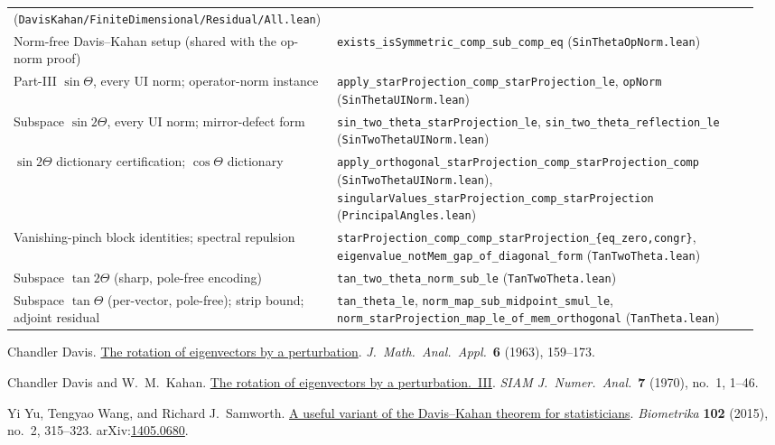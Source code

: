\documentclass[11pt]{article}
\theoremstyle{remark}
\begin{document}
\begin{center}
\begin{tabular}{@{}p{0.40\linewidth}p{0.56\linewidth}@{}}
    (\texttt{DavisKahan/FiniteDimensional/Residual/All.lean}) \\
Norm-free Davis--Kahan setup (shared with the op-norm proof)
  & \texttt{exists\_isSymmetric\_comp\_sub\_comp\_eq}
    (\texttt{SinThetaOpNorm.lean}) \\
Part-III $\sin\Theta$, every UI norm; operator-norm instance
  & \texttt{apply\_starProjection\_comp\_starProjection\_le},
    \texttt{opNorm} (\texttt{SinThetaUINorm.lean}) \\
Subspace $\sin2\Theta$, every UI norm; mirror-defect form
  & \texttt{sin\_two\_theta\_starProjection\_le},
    \texttt{sin\_two\_theta\_reflection\_le}
    (\texttt{SinTwoThetaUINorm.lean}) \\
$\sin2\Theta$ dictionary certification; $\cos\Theta$ dictionary
  & \texttt{apply\_orthogonal\_starProjection\_comp\_starProjection\_comp}
    (\texttt{SinTwoThetaUINorm.lean}),
    \texttt{singularValues\_starProjection\_comp\_starProjection}
    (\texttt{PrincipalAngles.lean}) \\
Vanishing-pinch block identities; spectral repulsion
  & \texttt{starProjection\_comp\_comp\_starProjection\_\{eq\_zero,congr\}},
    \texttt{eigenvalue\_notMem\_gap\_of\_diagonal\_form}
    (\texttt{TanTwoTheta.lean}) \\
Subspace $\tan2\Theta$ (sharp, pole-free encoding)
  & \texttt{tan\_two\_theta\_norm\_sub\_le} (\texttt{TanTwoTheta.lean}) \\
Subspace $\tan\Theta$ (per-vector, pole-free); strip bound; adjoint residual
  & \texttt{tan\_theta\_le}, \texttt{norm\_map\_sub\_midpoint\_smul\_le},
    \texttt{norm\_starProjection\_map\_le\_of\_mem\_orthogonal}
    (\texttt{TanTheta.lean}) \\
\bottomrule
\end{tabular}
\end{center}

\begin{thebibliography}{9}
Chandler Davis.
\newblock \href{https://doi.org/10.1016/0022-247X(63)90001-5}{The rotation of eigenvectors by a perturbation}.
\newblock \emph{J.\ Math.\ Anal.\ Appl.}\ \textbf{6} (1963), 159--173.

Chandler Davis and W.\ M.\ Kahan.
\newblock \href{https://doi.org/10.1137/0707001}{The rotation of eigenvectors by a perturbation.\ III}.
\newblock \emph{SIAM J.\ Numer.\ Anal.}\ \textbf{7} (1970), no.\ 1, 1--46.

Yi Yu, Tengyao Wang, and Richard J.\ Samworth.
\newblock \href{https://doi.org/10.1093/biomet/asv008}{A useful variant of the Davis--Kahan theorem for statisticians}.
\newblock \emph{Biometrika} \textbf{102} (2015), no.\ 2, 315--323.
\newblock arXiv:\href{https://arxiv.org/abs/1405.0680}{1405.0680}.
\end{thebibliography}
\end{document}

